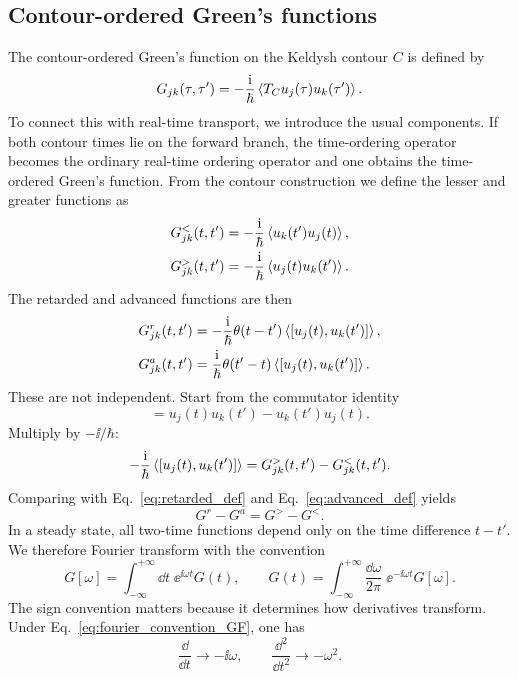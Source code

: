 \subsection{Contour-ordered Green's functions}
The contour-ordered Green's function on the Keldysh contour $C$ is defined by
\begin{equation}
    G_{jk}(\tau,\tau') = -\frac{\mathrm{i}}{\hbar}\left\langle T_C u_j(\tau)u_k(\tau') \right\rangle.
    \label{eq:contour_green_definition}
\end{equation}
To connect this with real-time transport, we introduce the usual components. If both contour times lie on the forward branch, the time-ordering operator becomes the ordinary real-time ordering operator and one obtains the time-ordered Green's function. From the contour construction we define the lesser and greater functions as
\begin{align}
    G^<_{jk}(t,t') &= -\frac{\mathrm{i}}{\hbar}\left\langle u_k(t')u_j(t) \right\rangle,
    \label{eq:lesser_def} \\
    G^>_{jk}(t,t') &= -\frac{\mathrm{i}}{\hbar}\left\langle u_j(t)u_k(t') \right\rangle.
    \label{eq:greater_def}
\end{align}
The retarded and advanced functions are then
\begin{align}
    G^r_{jk}(t,t') &= -\frac{\mathrm{i}}{\hbar}\theta(t-t')\left\langle [u_j(t),u_k(t')] \right\rangle,
    \label{eq:retarded_def} \\
    G^a_{jk}(t,t') &= \frac{\mathrm{i}}{\hbar}\theta(t'-t)\left\langle [u_j(t),u_k(t')] \right\rangle.
    \label{eq:advanced_def}
\end{align}
These are not independent. Start from the commutator identity
\begin{equation}
    [u_j(t),u_k(t')] = u_j(t)u_k(t') - u_k(t')u_j(t).
\end{equation}
Multiply by $-\ii/\hbar$:
\begin{equation}
    -\frac{\mathrm{i}}{\hbar}\left\langle [u_j(t),u_k(t')] \right\rangle = G^>_{jk}(t,t') - G^<_{jk}(t,t').
\end{equation}
Comparing with Eq.~\eqref{eq:retarded_def} and Eq.~\eqref{eq:advanced_def} yields
\begin{equation}
    G^r - G^a = G^> - G^<.
    \label{eq:spectral_identity}
\end{equation}
In a steady state, all two-time functions depend only on the time difference $t-t'$. We therefore Fourier transform with the convention
\begin{equation}
    G[\omega] = \int_{-\infty}^{+\infty}\dd t\;\ee^{\ii\omega t}G(t),
    \qquad
    G(t) = \int_{-\infty}^{+\infty}\frac{\dd\omega}{2\pi}\;\ee^{-\ii\omega t}G[\omega].
    \label{eq:fourier_convention_GF}
\end{equation}
The sign convention matters because it determines how derivatives transform. Under Eq.~\eqref{eq:fourier_convention_GF}, one has
\begin{equation}
    \frac{\dd}{\dd t} \longrightarrow -\ii\omega,
    \qquad
    \frac{\dd^2}{\dd t^2} \longrightarrow -\omega^2.
    \label{eq:derivative_fourier_rule}
\end{equation}

